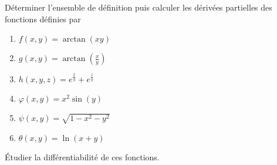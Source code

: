 \begin{exercice}\label{exoCalculDifferentiel0002}

Déterminer l'ensemble de définition puis calculer les dérivées partielles des fonctions définies par 
	\begin{enumerate}
		\item
$f(x,y) = \arctan(xy)$
\item
	$g(x,y) = \arctan\left( \frac{ x }{ y } \right)$
\item
$h(x,y,z) = e^{ \frac{x}{y}} +  e^{ \frac{z}{y}}$
\item
$\varphi (x,y)=x^2\sin(y)$
\item
$\psi(x,y) = \sqrt{1-x^2-y^2}$
\item
$\theta (x,y) = \ln(x+y)$
	\end{enumerate}
Étudier la différentiabilité de ces fonctions.


\end{exercice}
